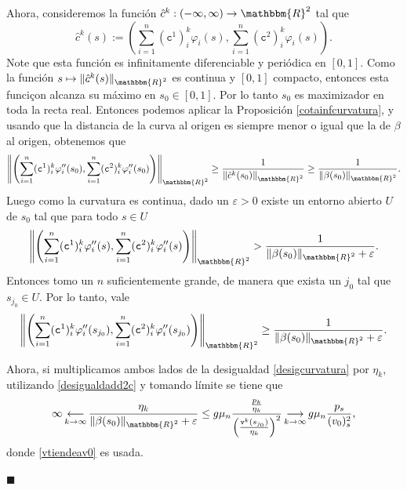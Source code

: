 \documentclass[a4paper,10pt]{book}
\newcommand{\R}{\mathbbm{R}}
\newcommand{\arr}{\rightarrow}
\newenvironment{dem}{\vspace*{-0.1cm}{\it Demostraci\'on:}}{\hfill
$\blacksquare$\\}
\begin{document}
\begin{dem}
Ahora, consideremos la función $\hat{c}^k:(-\infty,\infty)\arr\R^2$ tal que
\[
 \hat{c}^k(s):=\left(\sum_{i=1}^n(\texttt{c}^{1})^k_i\varphi_i(s), \sum_{i=1}^n(\texttt{c}^{2})^k_i\varphi_i(s)\right).
\]
Note que esta función es infinitamente diferenciable y periódica en $[0,1]$. Como la función $s\mapsto\|\hat{c}^k(s)\|_{\R^2}$ es continua y $[0,1]$ compacto, entonces esta funciçon alcanza su máximo en $s_0\in[0,1]$. Por lo tanto $s_0$ es maximizador en toda la recta real. Entonces podemos aplicar la Proposición \ref{cotainfcurvatura}, y usando que la distancia de la curva al origen es siempre menor o igual que la de $\beta$ al origen, obtenemos que 
$$\left\| \left(\sum_{i=1}^n(\texttt{c}^{1})^k_i\varphi_i''(s_0), \sum_{i=1}^n(\texttt{c}^{2})^k_i\varphi_i''(s_0)\right) \right\|_{\R^2}\geq\frac{1}{\left\| \hat{c}^k(s_0) \right\|_{\R^2}}\geq\frac{1}{\|\beta(s_0)\|_{\R^2}}.$$
Luego como la curvatura es continua, dado un $\varepsilon>0$ existe un entorno abierto $U$ de $s_0$ tal que para todo $s\in U$
$$\left\| \left(\sum_{i=1}^n(\texttt{c}^{1})^k_i\varphi_i''(s), \sum_{i=1}^n(\texttt{c}^{2})^k_i\varphi_i''(s)\right) \right\|_{\R^2}>\frac{1}{\|\beta(s_0)\|_{\R^2}+\varepsilon}.$$
Entonces tomo un $n$ suficientemente grande, de manera que exista un $j_0$ tal que $s_{j_0}\in U$. Por lo tanto, vale
\begin{equation}\label{desigcurvatura}
    \left\| \left(\sum_{i=1}^n(\texttt{c}^{1})^k_i\varphi_i''(s_{j_0}), \sum_{i=1}^n(\texttt{c}^{2})^k_i\varphi_i''(s_{j_0})\right) \right\|_{\R^2}\geq\frac{1}{\|\beta(s_0)\|_{\R^2}+ \varepsilon}.
\end{equation}






Ahora, si multiplicamos ambos lados de la desigualdad \eqref{desigcurvatura} por $\eta_k$, utilizando \eqref{desigualdadd2c} y tomando límite se tiene que
\begin{equation}\label{desetapv0}
    \infty\mathop{\longleftarrow}_{k\to\infty}\frac{\eta_k}{\|\beta(s_0)\|_{\R^2}+\varepsilon }\leq g\mu_n\frac{\frac{p_k}{\eta_k}}{\left(\frac{\texttt{v}^k(s_{j_0})}{\eta_k}\right)^2}\mathop{\longrightarrow}_{k\to\infty}g\mu_n\displaystyle\frac{p_s}{(v_0)^2_s},
\end{equation}
donde \eqref{vtiendeav0} es usada.


\end{dem}
\end{document}
